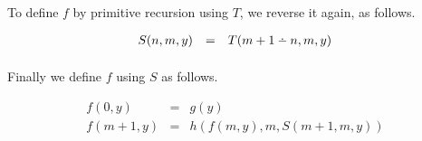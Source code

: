\documentclass{article}
\providecommand{\dotdiv}{%
  \mathbin{%
    \vphantom{+}%
    \text{%
      \mathsurround=0pt %
      \ooalign{%
        \noalign{\kern-.35ex}%
        \hidewidth$\smash{\cdot}$\hidewidth\cr %
        \noalign{\kern.35ex}%
        $-$\cr %
      }%
    }%
  }%
}
\begin{document}
\paragraph{} To define $f$ by primitive recursion using $T$, we reverse it again, as follows.

\[
\begin{array}{rcl}
  S(n,m,y) & = & T(m+1 \dotdiv n, m, y)
\end{array} 
\]


\paragraph{} Finally we define $f$ using $S$ as follows.

\[
\begin{array}{rcl}
  f(0,y) & = & g(y) \\
  f(m+1,y) & = & h(f(m,y), m , S(m+1,m,y))
\end{array} 
\]
\end{document}
